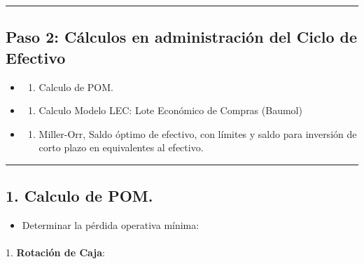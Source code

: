 \documentclass[
  letterpaper,
  DIV=11,
  numbers=noendperiod]{scrartcl}
\makeatletter
\let\oldparagraph\paragraph
\renewcommand{\paragraph}{
    \@ifstar
      \xxxParagraphStar
      \xxxParagraphNoStar
  }
\newcommand{\xxxParagraphStar}[1]{\oldparagraph*{#1}\mbox{}}
\newcommand{\xxxParagraphNoStar}[1]{\oldparagraph{#1}\mbox{}}
\providecommand{\tightlist}{%
  \setlength{\itemsep}{0pt}\setlength{\parskip}{0pt}}\usepackage{longtable,booktabs,array}
\makeatother
\begin{document}
\begin{center}\rule{0.5\linewidth}{0.5pt}\end{center}

\subsection{Paso 2: Cálculos en administración del Ciclo de
Efectivo}\label{paso-2-cuxe1lculos-en-administraciuxf3n-del-ciclo-de-efectivo}

\begin{itemize}
\tightlist
\item
  \begin{enumerate}
  \def\labelenumi{\arabic{enumi}.}
  \tightlist
  \item
    Calculo de POM.
  \end{enumerate}
\item
  \begin{enumerate}
  \def\labelenumi{\arabic{enumi}.}
  \setcounter{enumi}{1}
  \tightlist
  \item
    Calculo Modelo LEC: Lote Económico de Compras (Baumol)
  \end{enumerate}
\item
  \begin{enumerate}
  \def\labelenumi{\arabic{enumi}.}
  \setcounter{enumi}{2}
  \tightlist
  \item
    Miller-Orr, Saldo óptimo de efectivo, con límites y saldo para
    inversión de corto plazo en equivalentes al efectivo.
  \end{enumerate}
\end{itemize}

\begin{center}\rule{0.5\linewidth}{0.5pt}\end{center}

\subsection{1. Calculo de POM.}\label{calculo-de-pom.}

\begin{itemize}
\tightlist
\item
  Determinar la pérdida operativa mínima:
\end{itemize}

\paragraph{\texorpdfstring{1. \textbf{Rotación de
Caja}:}{1. Rotación de Caja:}}\label{rotaciuxf3n-de-caja-1}
\end{document}
